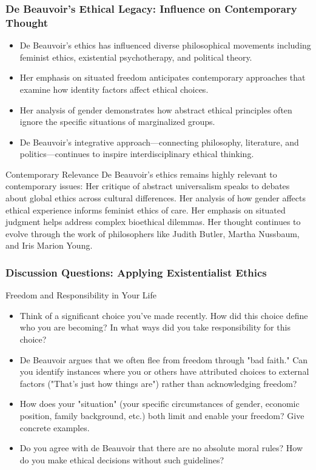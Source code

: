 \documentclass[aspectratio=169]{beamer}
\begin{document}
	\begin{frame}
		\frametitle{De Beauvoir's Ethical Legacy: Influence on Contemporary Thought}
		\begin{itemize}
			\item De Beauvoir's ethics has influenced diverse philosophical movements including feminist ethics, existential psychotherapy, and political theory.
			\item Her emphasis on situated freedom anticipates contemporary approaches that examine how identity factors affect ethical choices.
			\item Her analysis of gender demonstrates how abstract ethical principles often ignore the specific situations of marginalized groups.
			\item De Beauvoir's integrative approach—connecting philosophy, literature, and politics—continues to inspire interdisciplinary ethical thinking.
		\end{itemize}
		
		\begin{alertblock}{Contemporary Relevance}
			De Beauvoir's ethics remains highly relevant to contemporary issues: Her critique of abstract universalism speaks to debates about global ethics across cultural differences. Her analysis of how gender affects ethical experience informs feminist ethics of care. Her emphasis on situated judgment helps address complex bioethical dilemmas. Her thought continues to evolve through the work of philosophers like Judith Butler, Martha Nussbaum, and Iris Marion Young.
		\end{alertblock}
	\end{frame}
	
	
	\begin{frame}
		\frametitle{Discussion Questions: Applying Existentialist Ethics}
		\begin{block}{Freedom and Responsibility in Your Life}
			\begin{itemize}
				\item Think of a significant choice you've made recently. How did this choice define who you are becoming? In what ways did you take responsibility for this choice?
				\item De Beauvoir argues that we often flee from freedom through "bad faith." Can you identify instances where you or others have attributed choices to external factors ("That's just how things are") rather than acknowledging freedom?
				\item How does your "situation" (your specific circumstances of gender, economic position, family background, etc.) both limit and enable your freedom? Give concrete examples.
				\item Do you agree with de Beauvoir that there are no absolute moral rules? How do you make ethical decisions without such guidelines?
			\end{itemize}
		\end{block}
		
	\end{frame}
	
\end{document}
